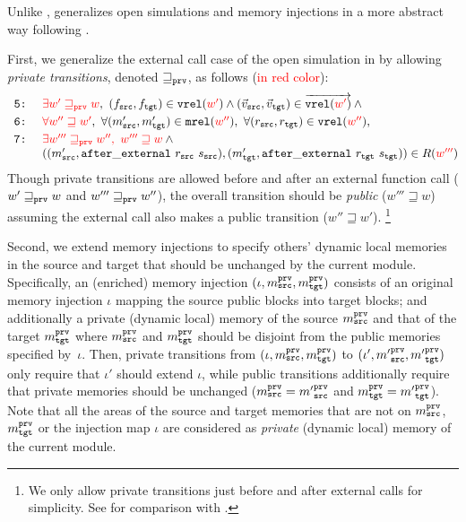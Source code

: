Unlike \ccc{}, \ccm{} generalizes open simulations and memory injections
in a more abstract way following \cite{DBLP:conf/icfp/DreyerNB10,pb}.

First, we generalize the external call case of the open simulation in 
by allowing \emph{private transitions}, denoted $\sqsupseteq_{\texttt{prv}}$,
as follows (\textcolor{red}{in red color}):
\[
\begin{array}{@{}l@{}}
\texttt{ 5:}~\quad \textcolor{red}{\exists w' \sqsupseteq_\weak w},~ (f_\src,f_\tgt)\in \texttt{vrel}(\textcolor{red}{w'}) \land (\vec{v}_\src,\vec{v}_\tgt) \in \overrightarrow{\texttt{vrel}(\textcolor{red}{w'})} \land{} \\[1mm]
\texttt{ 6:}~\quad \textcolor{red}{\forall w'' \sqsupseteq w'},~\forall (\memsrc',\memtgt')\in\texttt{mrel}(\textcolor{red}{w''}),~ \forall (r_\src,r_\tgt)\in \texttt{vrel}(\textcolor{red}{w''}),\\[1mm]
\texttt{ 7:}~\quad \textcolor{red}{\exists w''' \sqsupseteq_\weak w'',~ w''' \sqsupseteq w} \land {} \\
\phantom{\texttt{ 7:}}~\quad ((\memsrc',\mathtt{after\_external}~r_\src~\stsrc),(\memtgt',\mathtt{after\_external}~r_\tgt~\sttgt))\in R(\textcolor{red}{w'''})
\end{array}
\]
Though private transitions are allowed before and after an external function call (\ie
$w' \sqsupseteq_{\texttt{prv}} w$ and $w''' \sqsupseteq_{\texttt{prv}} w''$),
the overall transition should be \emph{public} (\ie $w''' \sqsupseteq w$)
assuming the external call also makes a public transition (\ie $w'' \sqsupseteq w'$).%
\footnote{We only allow private transitions just before and after external calls for simplicity.
See  for comparison with \cite{DBLP:conf/icfp/DreyerNB10,pb}.}

Second, we extend memory injections to specify others' dynamic local
memories in the source and target that should be unchanged by the current module.
Specifically, an (enriched) memory injection $(\iota, m^{\texttt{prv}}_{\texttt{src}}, m^{\texttt{prv}}_{\texttt{tgt}})$
consists of an original memory injection $\iota$ mapping the source public blocks into target blocks; and additionally
a private (\ie dynamic local) memory of the source $m^{\texttt{prv}}_{\texttt{src}}$ and that of the target $m^{\texttt{prv}}_{\texttt{tgt}}$
where $m^{\texttt{prv}}_{\texttt{src}}$ and $m^{\texttt{prv}}_{\texttt{tgt}}$ should be disjoint from the public memories specified by~$\iota$.
Then, private transitions from $(\iota, m^{\texttt{prv}}_{\texttt{src}}, m^{\texttt{prv}}_{\texttt{tgt}})$ to
$(\iota', {m'}^{\texttt{prv}}_{\texttt{src}}, {m'}^{\texttt{prv}}_{\texttt{tgt}})$ only require that $\iota'$ should extend $\iota$,
while public transitions additionally require that private memories should be unchanged
(\ie $m^{\texttt{prv}}_{\texttt{src}} = {m'}^{\texttt{prv}}_{\texttt{src}}$ and $m^{\texttt{prv}}_{\texttt{tgt}} = {m'}^{\texttt{prv}}_{\texttt{tgt}}$).
Note that all the areas of the source and target memories that are not on $m^{\texttt{prv}}_{\texttt{src}}$, $m^{\texttt{prv}}_{\texttt{tgt}}$ or the injection map $\iota$
are considered as \emph{private} (\ie dynamic local) memory of the current module.

